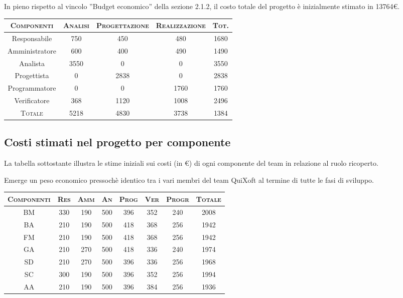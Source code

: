 \documentclass[11pt,a4paper]{article}
\begin{document}
In pieno rispetto al vincolo ''Budget economico'' della sezione 2.1.2, il costo totale del progetto è inizialmente stimato in 13764\euro.
\begin{center}
\begin{tabular}{|c||c|c|c||c|}
\hline
\textsc{Componenti}& \textsc{Analisi} & \textsc{Progettazione} & \textsc{Realizzazione} & \textsc{Tot.} \\ \hline \hline
Responsabile & 750 & 450 & 480 & 1680 \\ \hline
Amministratore & 600 & 400 & 490 & 1490 \\ \hline
Analista & 3550 & 0 & 0 & 3550 \\ \hline
Progettista & 0 & 2838 & 0 & 2838 \\ \hline
Programmatore & 0 & 0 & 1760 & 1760 \\ \hline
Verificatore & 368 & 1120 & 1008 & 2496 \\ \hline \hline
\textsc{Totale} & 5218 & 4830 & 3738 & 1384 \\ \hline
\end{tabular}
\end{center}
\subsection{Costi stimati nel progetto per componente}
La tabella sottostante illustra le stime iniziali sui costi (in \euro) di ogni componente del team in relazione al ruolo ricoperto.

Emerge un peso economico pressochè identico tra i vari membri del team QuiXoft al termine di tutte le fasi di sviluppo.
\begin{center}
\begin{tabular}{|c||c|c|c|c|c|c||c|}
\hline
\textsc{Componenti} & \textsc{Res} & \textsc{Amm} & \textsc{An} & \textsc{Prog} & \textsc{Ver} & \textsc{Progr} & \textsc{Totale}\\
\hline \hline
BM & 330 & 190 & 500 & 396 & 352 & 240 & 2008 \\ \hline
BA & 210 & 190 & 500 & 418 & 368 & 256 & 1942 \\ \hline
FM & 210 & 190 & 500 & 418 & 368 & 256 & 1942 \\ \hline
GA & 210 & 270 & 500 & 418 & 336 & 240 & 1974 \\ \hline
SD & 210 & 270 & 500 & 396 & 336 & 256 & 1968 \\ \hline
SC & 300 & 190 & 500 & 396 & 352 & 256 & 1994 \\ \hline
AA & 210 & 190 & 500 & 396 & 384 & 256 & 1936 \\ \hline
\end{tabular}
\end{center}
\end{document}
